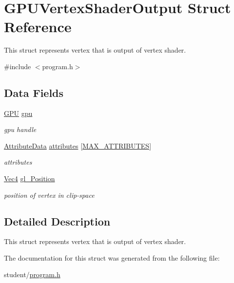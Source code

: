 \hypertarget{structGPUVertexShaderOutput}{}\section{G\+P\+U\+Vertex\+Shader\+Output Struct Reference}
\label{structGPUVertexShaderOutput}


This struct represents vertex that is output of vertex shader.  




{\ttfamily \#include $<$program.\+h$>$}

\subsection*{Data Fields}
\begin{DoxyCompactItemize}
\item 
\hyperlink{fwd_8h_a06964ec111fe28721d8618b6d0d993bf}{G\+PU} \hyperlink{structGPUVertexShaderOutput_a7eff72bf2de93c80688800ffcd142e34}{gpu}\hypertarget{structGPUVertexShaderOutput_a7eff72bf2de93c80688800ffcd142e34}{}\label{structGPUVertexShaderOutput_a7eff72bf2de93c80688800ffcd142e34}

\begin{DoxyCompactList}\small\item\em gpu handle \end{DoxyCompactList}\item 
\hyperlink{fwd_8h_aa9879a02fad39161594e48222b5d9660}{Attribute\+Data} \hyperlink{structGPUVertexShaderOutput_acb55a42bf173ac38ad5a9c0951758e52}{attributes} \mbox{[}\hyperlink{fwd_8h_a4d992a1f9192388588184753115f6c03}{M\+A\+X\+\_\+\+A\+T\+T\+R\+I\+B\+U\+T\+ES}\mbox{]}\hypertarget{structGPUVertexShaderOutput_acb55a42bf173ac38ad5a9c0951758e52}{}\label{structGPUVertexShaderOutput_acb55a42bf173ac38ad5a9c0951758e52}

\begin{DoxyCompactList}\small\item\em attributes \end{DoxyCompactList}\item 
\hyperlink{structVec4}{Vec4} \hyperlink{structGPUVertexShaderOutput_a9ff78df1457c9f433df05ba8858d90fe}{gl\+\_\+\+Position}\hypertarget{structGPUVertexShaderOutput_a9ff78df1457c9f433df05ba8858d90fe}{}\label{structGPUVertexShaderOutput_a9ff78df1457c9f433df05ba8858d90fe}

\begin{DoxyCompactList}\small\item\em position of vertex in clip-\/space \end{DoxyCompactList}\end{DoxyCompactItemize}


\subsection{Detailed Description}
This struct represents vertex that is output of vertex shader. 

The documentation for this struct was generated from the following file\+:\begin{DoxyCompactItemize}
\item 
student/\hyperlink{program_8h}{program.\+h}\end{DoxyCompactItemize}

